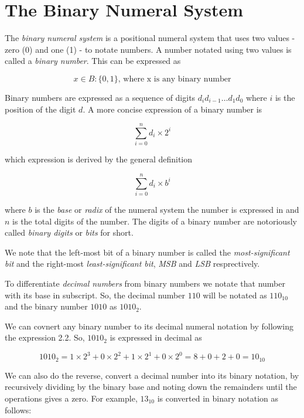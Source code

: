 \section{The Binary Numeral System}

The \textit{binary numeral system} is a positional numeral system that uses two values -
zero (0) and one (1) - to notate numbers. A number notated using two values is called
a \textit{binary number}. This can be expressed as

\begin{equation}
    x \in B:\{0, 1\}\text{, where x is any binary number}
\end{equation}

Binary numbers are expressed as a sequence of digits $d_id_{i-1}\ldots d_1d_0$
where $i$ is the position of the digit $d$. A more concise expression of
a binary number is

\begin{equation}
    \sum_{i=0}^{n}d_i\times2^i
\end{equation}

which expression is derived by the general definition

\begin{equation}
    \sum_{i=0}^{n}d_i\times b^i
\end{equation}

where $b$ is the \textit{base} or \textit{radix} of the numeral system the
number is expressed in and $n$ is the total digits of the number. The digits
of a binary number are notoriously called \textit{binary digits} or \textit{bits}
for short.

We note that the left-most bit of a binary number is called the \textit{most-significant bit}
and the right-most \textit{least-significant bit}, \textit{MSB} and \textit{LSB} resprectively.

To differentiate \textit{decimal numbers} from binary numbers we notate that
number with its base in subscript. So, the decimal number $110$ will be
notated as $110_{10}$ and the binary number $1010$ as $1010_2$.

We can covnert any binary number to its decimal numeral notation by
following the expression 2.2. So, $1010_2$ is expressed in decimal as

\begin{equation}
    1010_2 = 1 \times 2^3 + 0 \times 2^2 + 1 \times 2^1  + 0 \times 2^0 = 8 + 0 + 2 + 0 = 10_{10}
\end{equation}

We can also do the reverse, convert a decimal number into its binary notation, by recursively
dividing by the binary base and noting down the remainders until the operations gives a zero.
For example, $13_{10}$ is converted in binary notation as follows:


